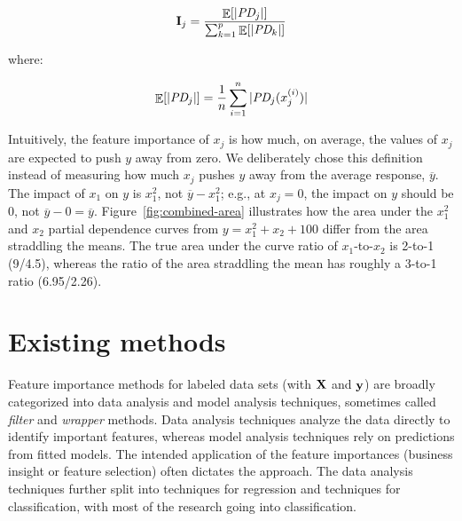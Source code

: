\documentclass[twoside,11pt]{article}
\newcommand{\figref}[1]{Figure~\ref{#1}}
\newcommand{\todo}[1]{{{\color{red}{[#1]}}}}
\newcommand{\Ex}{\mathop{\mathbb{E}}}
\newcommand{\Imp}{\mathbf{I}}
\newcommand{\spd}{\fontfamily{cmr}\textsc{\small StratPD}}
\begin{document}
\begin{equation}\label{eq:Epd2b}
\Imp_j = \frac{\Ex[|\text{\it PD}_j|]}{\sum_{k=1}^p \Ex[|\text{\it PD}_k|]}
\end{equation}

\noindent where:

\begin{equation}\label{eq:Epd2c}
\Ex[|\text{\it PD}_j|] = \frac{1}{n} \sum_{i=1}^{n} |\text{\it PD}_j(x_j^{(i)})|
\end{equation}

\todo{
\begin{itemize}
\item Do we need to explain why that is a weighted sum? i.e., repeated $x_j^{(i)}$ values and in repeated partial dependence values.
\item in our case $n$ differs for each $x_j$ due to implementation details of \spd{} but in the general case can't we therefore remove that common factor and just say that the weighted sum relative to other variables' weighted sum is the importance?
\item do we need to point out that $\sum_{k=1}^p \Ex[|\text{\it PD}_k|]$ is not the expected value of avg $|y|$? I.e., why are we not dividing by avg $|y|$?
\end{itemize}
}

Intuitively, the feature importance of $x_j$ is how much, on average, the values of $x_j$ are expected to push $y$ away from zero. We deliberately chose this  definition instead of measuring how much $x_j$ pushes $y$ away from the average response, $\overline{y}$. The impact of $x_1$ on $y$ is $x_1^2$, not $\overline{y} - x_1^2$; e.g., at $x_j=0$, the impact on $y$ should be 0, not $\overline{y}-0 = \overline{y}$.  \figref{fig:combined-area} illustrates how the area under the $x_1^2$ and $x_2$ partial dependence curves from $y = x_1^2+x_2+100$ differ from the area straddling the means. The true area under the curve ratio of $x_1$-to-$x_2$ is 2-to-1 (9/4.5), whereas the ratio of the area straddling the mean has roughly a 3-to-1 ratio (6.95/2.26). \todo{is this clear enough?}
 
\section{Existing methods}\label{sec:existing}

Feature importance methods for labeled data sets (with $\bf X$ and $\bf y$) are broadly categorized into data analysis and model analysis techniques, sometimes called {\em filter} and {\em wrapper} methods. Data analysis techniques analyze the data directly to identify important features, whereas model analysis techniques rely on predictions from fitted models.  The intended application of the feature importances (business insight or feature selection) often dictates the approach.  The data analysis techniques further split into techniques for regression and techniques for classification, with most of the research going into classification.
\end{document}
